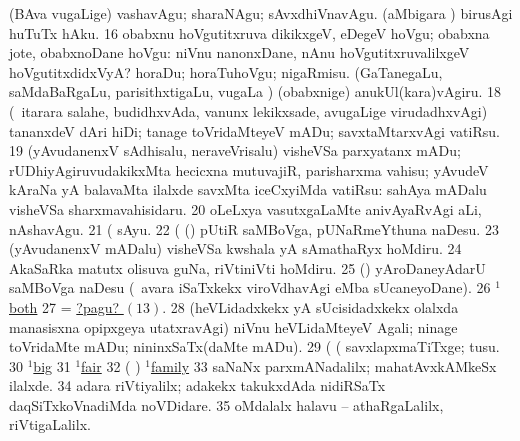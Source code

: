  (BAva \mo vugaLige) vashavAgu; sharaNAgu; sAvxdhiVnavAgu. 
 (aMbigara \vi) birusAgi huTuTx hAku. 
\eanum
\numie
\num{16}  obabxnu hoVgutitxruva dikikxgeV, eDegeV hoVgu; obabxna jote, obabxnoDane hoVgu:  niVnu nanonxDane, nAnu hoVgutitxruvalilxgeV hoVgutitxdidxVyA? 
  
\banum
{} horaDu; horaTuhoVgu; nigaRmisu. 
 (GaTanegaLu, saMdaBaRgaLu, parisithxtigaLu, \mo vugaLa \vi) (obabxnige) anukUl(kara)vAgiru. 
\eanum
\numie
\num{18}  (\kanmu\ itarara salahe, budidhxvAda, \mo vanunx lekikxsade, avugaLige virudadhxvAgi) tananxdeV dAri hiDi; tanage toVridaMteyeV mADu; savxtaMtarxvAgi vatiRsu. 
\num{19}  (yAvudanenxV sAdhisalu, neraveVrisalu) visheVSa parxyatanx mADu; rUDhiyAgiruvudakikxMta hecicxna mutuvajiR, parisharxma vahisu; yAvudeV kAraNa yA balavaMta ilalxde savxMta iceCxyiMda vatiRsu:  sahAya mADalu visheVSa sharxmavahisidaru. 
\num{20}  oLeLxya vasutxgaLaMte anivAyaRvAgi aLi, nAshavAgu. 
\num{21}  (    sAyu. 
\num{22}  (  (\AmA) pUtiR saMBoVga, pUNaRmeYthuna naDesu. 
\num{23}  (yAvudanenxV mADalu) visheVSa kwshala yA sAmathaRyx hoMdiru. 
\num{24}  AkaSaRka matutx olisuva guNa, riVtiniVti hoMdiru. 
\num{25}  (\hA) yAroDaneyAdarU saMBoVga naDesu (\kanmu\ avara iSaTxkekx viroVdhavAgi eMba sUcaneyoDane). 
\num{26}  \hyperref{kandict_b.pdf}{B}{both(1) nuga(2)}{$^1$both}  
\num{27}  = \hyperlink{way pagu13}{?pagu? \((13)\)}. 
\num{28}  (heVLidadxkekx yA sUcisidadxkekx olalxda manasisxna opipxgeya utatxravAgi) niVnu heVLidaMteyeV Agali; ninage toVridaMte mADu; nininxSaTx(daMte mADu). 
\num{29}  (  (  savxlapxmaTiTxge; tusu. 
\num{30}  \hyperref{kandict_b.pdf}{B}{big(1) nuga(3)}{$^1$big}  
\num{31}  \hyperref{kandict_f.pdf}{F}{fair(1) nuga(8)}{$^1$fair}  
\num{32}  ( ) \hyperref{kandict_f.pdf}{F}{family(1) nuga(1)}{$^1$family}  
\num{33}  saNaNx parxmANadalilx; mahatAvxkAMkeSx ilalxde. 
\num{34}  adara riVtiyalilx; adakekx takukxdAda nidiRSaTx daqSiTxkoVnadiMda noVDidare. 
\num{35}  oMdalalx halavu -- athaRgaLalilx, riVtigaLalilx. 
